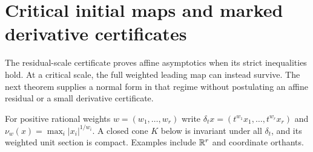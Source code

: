 \section{Critical initial maps and marked derivative certificates}\label{sec:critical-jets}
The residual-scale certificate proves affine asymptotics when its strict inequalities hold. At a critical scale, the full weighted leading map can instead survive. The next theorem supplies a normal form in that regime without postulating an affine residual or a small derivative certificate.

For positive rational weights $w=(w_1,\ldots,w_r)$ write
$\delta_t x=(t^{w_1}x_1,\ldots,t^{w_r}x_r)$ and
$\nu_w(x)=\max_i|x_i|^{1/w_i}$. A closed cone $K$ below is invariant under all $\delta_t$, and its weighted unit section is compact. Examples include $\mathbb R^r$ and coordinate orthants.

